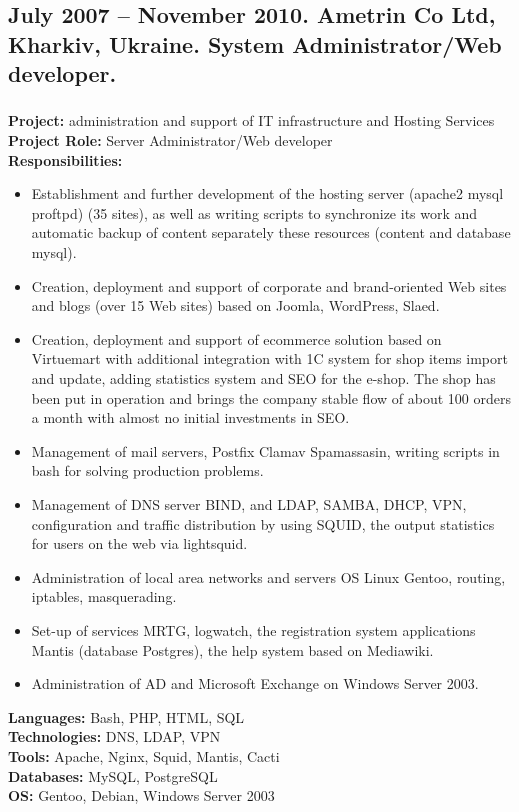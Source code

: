 \documentclass[letterpaper]{article}
\begin{document}
\subsection{July 2007 – November 2010. Ametrin Co Ltd, Kharkiv, Ukraine. System Administrator/Web developer.}
\label{sec-2-2}
\subsubsection{}
\label{sec-2-2-1}
\textbf{Project:} administration and support of IT infrastructure and Hosting Services\\
\textbf{Project Role:}  Server Administrator/Web developer\\
\textbf{Responsibilities:}\\
\begin{itemize}
\item Establishment and further development of the hosting server (apache2 mysql proftpd) (35 sites), as well as writing scripts to synchronize its work and automatic backup of content separately these resources (content and database mysql).
\item Creation, deployment and support of corporate and brand-oriented Web sites and blogs (over 15 Web sites) based on Joomla, WordPress, Slaed.
\item Creation, deployment and support of ecommerce solution based on Virtuemart with additional integration with 1C system for shop items import and update, adding statistics system and SEO for the e-shop. The shop has been put in operation and brings the company stable flow of about 100 orders a month with almost no initial investments in SEO.
\item Management of mail servers, Postfix Clamav Spamassasin, writing scripts in bash for solving production problems.
\item Management of DNS server BIND, and LDAP, SAMBA, DHCP, VPN, configuration and traffic distribution by using SQUID, the output statistics for users on the web via lightsquid.
\item Administration of local area networks and servers OS Linux Gentoo, routing, iptables, masquerading.
\item Set-up of services MRTG, logwatch, the registration system applications Mantis (database Postgres), the help system based on Mediawiki.
\item Administration of AD and Microsoft Exchange on Windows Server 2003.
\end{itemize}
\textbf{Languages:} Bash, PHP,  HTML, SQL\\
\textbf{Technologies:} DNS, LDAP, VPN\\
\textbf{Tools:}  Apache, Nginx, Squid, Mantis, Cacti\\
\textbf{Databases:} MySQL, PostgreSQL\\
\textbf{OS:} Gentoo, Debian, Windows Server 2003\\
\end{document}
